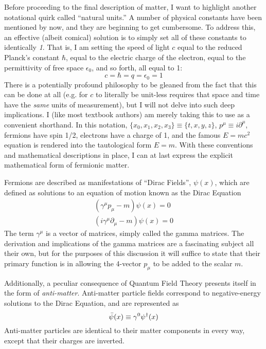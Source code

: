     Before proceeding to the final description of matter, I want to highlight another notational quirk called ``natural units.''
    A number of physical constants have been mentioned by now, and they are beginning to get cumbersome.
    To address this, an effective (albeit comical) solution is to simply set all of these constants to identically \textit{1}.
    That is, I am setting the speed of light $c$ equal to the reduced Planck's constant $\hbar$,
        equal to the electric charge of the electron, equal to the permittivity of free space $\epsilon_0$,
        and so forth, all equal to 1:
    \begin{equation} c=\hbar=q=\epsilon_0=1 \end{equation}
    There is a potentially profound philosophy to be gleaned from the fact that this can be done at all
        (e.g. for $c$ to literally be unit-less requires that space and time have the \textit{same} units of measurement),
        but I will not delve into such deep implications.
    I (like most textbook authors) am merely taking this to use as a convenient shorthand.
    In this notation, $\{x_0, x_1, x_2, x_3\} \equiv \{t,x,y,z\}$,
        $p^\mu \equiv i \partial^\mu$,
        fermions have spin 1/2,
        electrons have a charge of 1,
        and the famous $E=mc^2$ equation is rendered into the tautological form $E=m$.
    With these conventions and mathematical descriptions in place,
        I can at last express the explicit mathematical form of fermionic matter.

    Fermions are described as manifestations of ``Dirac Fields'', $\psi(x)$,
        which are defined as solutions to an equation of motion known as the Dirac Equation
    \begin{equation} \begin{split}
        (\gamma^\mu p_\mu - m) \psi(x) = 0
        \\ (i\gamma^\mu \partial_\mu - m) \psi(x) = 0
    \end{split} \end{equation}
    The term $\gamma^\mu$ is a vector of matrices, simply called the gamma matrices.
    The derivation and implications of the gamma matrices are a fascinating subject all their own, 
        but for the purposes of this discussion it will suffice to state that
        their primary function is in allowing the 4-vector $p_\mu$ to be added to the scalar $m$.

    Additionally, a peculiar consequence of Quantum Field Theory presents itself in the form of \textit{anti-matter}.
    Anti-matter particle fields correspond to negative-energy solutions to the Dirac Equation,
        and are represented as
    \begin{equation}
        \bar{\psi}(x) \equiv \gamma^0 \psi^\dag(x)
    \end{equation}
    Anti-matter particles are identical to their matter components in every way,
        except that their charges are inverted.

